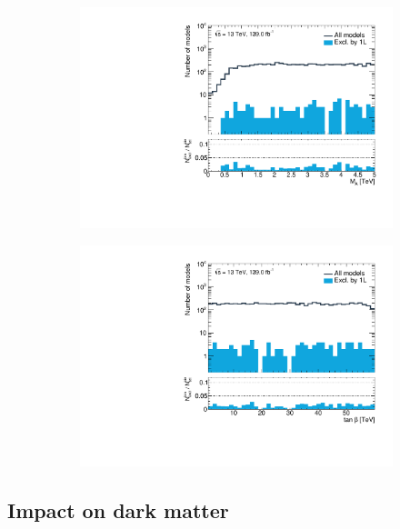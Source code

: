 \begin{figure}
\begin{subfigure}[b]{0.5\linewidth}
	\end{subfigure}\hfill
	\begin{subfigure}[b]{0.5\linewidth}
		\centering\includegraphics[width=\textwidth]{1D/mA}
	\end{subfigure}\hfill
	\begin{subfigure}[b]{0.5\linewidth}
		\centering\includegraphics[width=\textwidth]{1D/tanb}
	\end{subfigure}\hfill
	\caption{}
	\label{fig:impact_pMSSM_parameters_1D}
\end{figure}

\subsection{Impact on dark matter}

